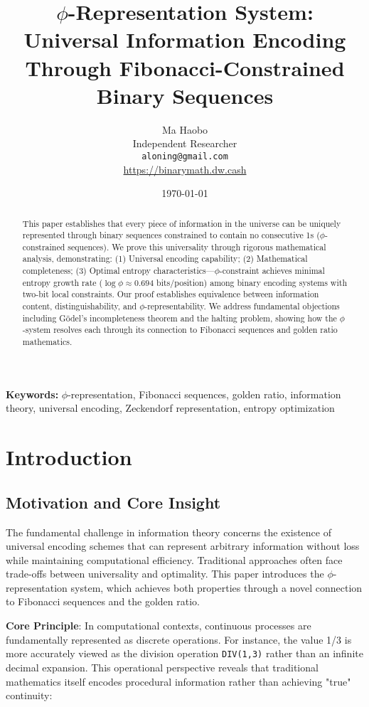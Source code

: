 \documentclass[12pt,letterpaper]{article}
\title{$\phi$-Representation System: Universal Information Encoding Through Fibonacci-Constrained Binary Sequences}
\author{Ma Haobo\\
Independent Researcher\\
\texttt{aloning@gmail.com}\\
\url{https://binarymath.dw.cash}}
\date{\today}
\begin{document}
\maketitle

\begin{abstract}
This paper establishes that every piece of information in the universe can be uniquely represented through binary sequences constrained to contain no consecutive 1s ($\phi$-constrained sequences). We prove this universality through rigorous mathematical analysis, demonstrating: (1) Universal encoding capability; (2) Mathematical completeness; (3) Optimal entropy characteristics—$\phi$-constraint achieves minimal entropy growth rate ($\log \phi \approx 0.694$ bits/position) among binary encoding systems with two-bit local constraints. Our proof establishes equivalence between information content, distinguishability, and $\phi$-representability. We address fundamental objections including Gödel's incompleteness theorem and the halting problem, showing how the $\phi$-system resolves each through its connection to Fibonacci sequences and golden ratio mathematics.
\end{abstract}

\textbf{Keywords:} $\phi$-representation, Fibonacci sequences, golden ratio, information theory, universal encoding, Zeckendorf representation, entropy optimization

\thispagestyle{empty}
\newpage

\tableofcontents
\newpage

\section{Introduction}

\subsection{Motivation and Core Insight}

The fundamental challenge in information theory concerns the existence of universal encoding schemes that can represent arbitrary information without loss while maintaining computational efficiency. Traditional approaches often face trade-offs between universality and optimality. This paper introduces the $\phi$-representation system, which achieves both properties through a novel connection to Fibonacci sequences and the golden ratio.

\textbf{Core Principle}: In computational contexts, continuous processes are fundamentally represented as discrete operations. For instance, the value 1/3 is more accurately viewed as the division operation \texttt{DIV(1,3)} rather than an infinite decimal expansion. This operational perspective reveals that traditional mathematics itself encodes procedural information rather than achieving "true" continuity:
\end{document}
